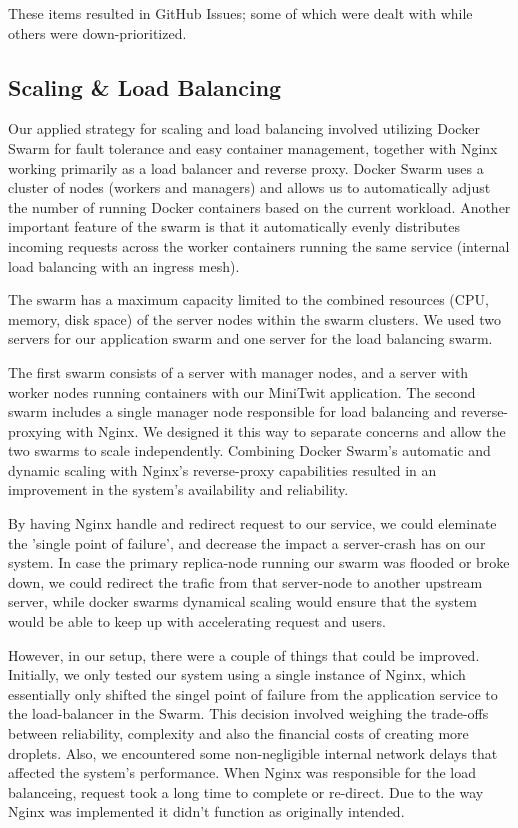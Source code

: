 \noindent These items resulted in GitHub Issues; some of which were dealt with while others were down-prioritized.

\subsection{Scaling \& Load Balancing}

Our applied strategy for scaling and load balancing involved utilizing Docker Swarm for fault tolerance and easy container management, together with Nginx working primarily as a load balancer and reverse proxy. Docker Swarm uses a cluster of nodes (workers and managers) and allows us to automatically adjust the number of running Docker containers based on the current workload. Another important feature of the swarm is that it automatically evenly distributes incoming requests across the worker containers running the same service (internal load balancing with an ingress mesh).

The swarm has a maximum capacity limited to the combined resources (CPU, memory, disk space) of the server nodes within the swarm clusters. We used two servers for our application swarm and one server for the load balancing swarm.

The first swarm consists of a server with manager nodes, and a server with worker nodes running containers with our MiniTwit application. The second swarm includes a single manager node responsible for load balancing and reverse-proxying with Nginx. We designed it this way to separate concerns and allow the two swarms to scale independently. Combining Docker Swarm's automatic and dynamic scaling with Nginx's reverse-proxy capabilities resulted in an improvement in the system's availability and reliability.

By having Nginx handle and redirect request to our service, we could eleminate the 'single point of failure', and decrease the impact a server-crash has on our system. In case the primary replica-node running our swarm was flooded or broke down, we could redirect the trafic from that server-node to another upstream server, while docker swarms dynamical scaling would ensure that the system would be able to keep up with accelerating request and users.

However, in our setup, there were a couple of things that could be improved.
Initially, we only tested our system using a single instance of Nginx, which essentially only shifted the singel point of failure from the application service to the load-balancer in the Swarm. This decision involved weighing the trade-offs between reliability, complexity and also the financial costs of creating more droplets.
Also, we encountered some non-negligible internal network delays that affected the system's performance. When Nginx was responsible for the load balanceing, request took a long time to complete or re-direct. Due to the way Nginx was implemented it didn't function as originally intended.


